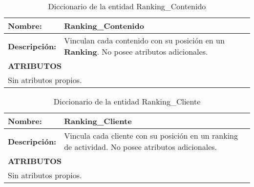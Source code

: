 \newpage
\renewcommand{\arraystretch}{1.3}
\begin{longtable}{|p{3.5cm}|p{10cm}|}
\caption{Diccionario de la entidad Ranking\_Contenido}
\label{tab:diccionarioRankingContenido} \\ \hline
\textbf{Nombre:} & Ranking\_Contenido \\ \hline
\textbf{Descripción:} & 
Vinculan cada contenido con su posición en un \textbf{Ranking}.  No posee atributos adicionales. \\ \hline
\multicolumn{2}{|p{13.5cm}|}{\textbf{ATRIBUTOS}} \\ \hline
\multicolumn{2}{|p{13.5cm}|}{Sin atributos propios.} \\ \hline
\end{longtable}

\renewcommand{\arraystretch}{1.3}
\begin{longtable}{|p{3.5cm}|p{10cm}|}
\caption{Diccionario de la entidad Ranking\_Cliente}
\label{tab:diccionarioRankingCliente} \\ \hline
\textbf{Nombre:} & Ranking\_Cliente \\ \hline
\textbf{Descripción:} & 
 Vincula cada cliente con su posición en un ranking de actividad.  No posee atributos adicionales. \\ \hline
\multicolumn{2}{|p{13.5cm}|}{\textbf{ATRIBUTOS}} \\ \hline
\multicolumn{2}{|p{13.5cm}|}{Sin atributos propios.} \\ \hline
\end{longtable}
